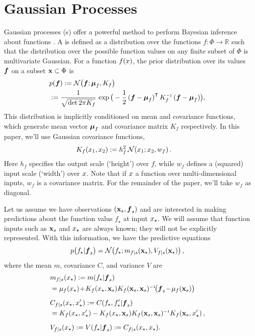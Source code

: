 \documentclass{article}
\renewcommand{\pskinny}[2]{p\big(#1|#2\big)}
\begin{document}
\section{Gaussian Processes}
Gaussian processes (\gp s) offer a powerful method to perform Bayesian inference about functions \citep{GPsBook}. A \gpb is defined as a distribution over the functions $f: \Phi \rightarrow \mathbb{R}$ such that the distribution over the possible function values on any finite subset of $\Phi$ is multivariate Gaussian.  For a function $f(\lfv)$, the prior distribution over its values $\vf$ on a subset $\vlfv \subset \Phi$ is
\begin{align*}%
\textstyle
 &\po{\vf}\deq \N{\vf}{\vmu_{f}}{K_{f}}\\
 &\deq\frac{1}{\sqrt{\det{2\pi K_{f}}}}\,\exp \big(-\frac{1}{2}\,(\vf-\vmu_{f})\tra\,K_{f}\inv\,(\vf-\vmu_{f})\big),
\end{align*}
This distribution is implicitly conditioned on mean and covariance functions, which generate mean vector $\vmu_{f}$ and covariance matrix $K_{f}$ respectively. 
In this paper, we'll use Gaussian covariance functions,
\begin{align} \label{eq:Gaussian_cov_fn}
\textstyle
K_{f}(\lfv_1,\lfv_2)& \deq h_f^2\,\N{\lfv_1}{\lfv_2}{w_{f}}.
\end{align} 
Here $h_f$ specifies the output scale (`height') over $f$, while $w_f$ defines a (squared) input scale (`width') over $\lfv$. Note that if $\lfv$ a function over multi-dimensional inputs, $w_f$ is a covariance matrix. For the remainder of the paper, we'll take $w_f$ as diagonal. 


Let us assume we have observations $(\vlfv_s,\vf_s)$ and are interested in making predictions about the function valus $f_\star$ at input $\lfv_\star$. We will assume that function inputs such as $\vlfv_s$ and $\lfv_\star$ are always known; they will not be explicitly represented. With this information, we have the predictive equations
$$
\pskinny{f\st}{\vf_s} = 
\bN{f\st}
{\meancond{f}{\vlfv_\star}{s}}
{\covcond{f}{\vlfv_\star}{s}}\,,
$$
where the mean $m$, covariance $C$, and variance $V$ are
\begin{align} 
\textstyle
&\meancond{f}{\lfv_\star}{s}
\deq \mean{f_\star}{\vf_s}
\nonumber\\
&= \mu_{f}(\lfv_\star)\!+\!
K_{f}(\lfv_\star,\vlfv_s)
K_{f}(\vlfv_s,\vlfv_s)\inv\!
\bigl(\vf_s\!-\!{\mu}_{f}(\vlfv_s)\bigr)\label{eq:GPMean}
\\[0.2cm]
&C_{f|s}(\lfv_\star, \lfv'_\star)
\deq C(f_\star,f'_\star|\vf_s) 
\nonumber\\
&= K_{f}(\lfv_\star,\lfv'_\star) - 
K_{f}(\lfv_\star,\vlfv_s)
K_{f}(\vlfv_s,\vlfv_s)\inv
K_{f}(\vlfv_s,\lfv'_\star)\,, \nonumber%
\\[0.2cm]
&\covcond{f}{\lfv_\star}{s}
\deq {\cov{f_\star}{\vf_s}} 
\deq C_{f|s}(\lfv_\star, \lfv_\star).\nonumber
\end{align} 
\end{document}
